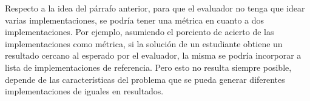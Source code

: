 \documentclass[a4paper,12pt]{book}
\begin{document}
	Respecto a la idea del párrafo anterior, para que el evaluador no tenga que idear varias implementaciones, se podría tener una métrica en cuanto a dos implementaciones. Por ejemplo, asumiendo el porciento de acierto de las implementaciones como métrica, si la solución de un estudiante obtiene un resultado cercano al esperado por el evaluador, la misma se podría incorporar a lista de implementaciones de referencia. Pero esto no resulta siempre posible, depende de las características del problema que se pueda generar diferentes implementaciones de iguales en resultados.
	



\end{document}

